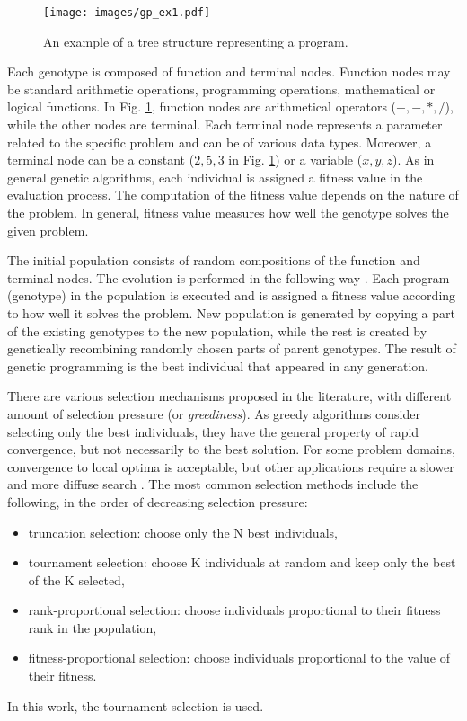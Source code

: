 \begin{figure}[H]
    \centering
    \texttt{[image: images/gp\_ex1.pdf]}
    \caption{An example of a tree structure representing a program.}
    \label{genprog:ex1}
\end{figure}

Each genotype is composed of function and terminal nodes.
Function nodes may be standard arithmetic operations, programming operations, mathematical or logical functions.
In Fig. \ref{genprog:ex1}, function nodes are arithmetical operators ($+, -, *, /$), while the other nodes are terminal.
Each terminal node represents a parameter related to the specific problem and can be of various data types.
Moreover, a terminal node can be a constant ($2, 5, 3$ in Fig. \ref{genprog:ex1}) or a variable ($x, y, z$).
As in general genetic algorithms, each individual is assigned a fitness value in the evaluation process.
The computation of the fitness value depends on the nature of the problem.
In general, fitness value measures how well the genotype solves the given problem.

The initial population consists of random compositions of the function and terminal nodes.
The evolution is performed in the following way \cite{koza1992genetic}.
Each program (genotype) in the population is executed and is assigned a fitness value according to how well it solves the problem.
New population is generated by copying a part of the existing genotypes to the new population, while the rest is created by genetically recombining randomly chosen parts of parent genotypes.
The result of genetic programming is the best individual that appeared in any generation.

There are various selection mechanisms proposed in the literature, with different amount of selection pressure (or \textit{greediness}).
As greedy algorithms consider selecting only the best individuals, they have the general property of rapid convergence, but not necessarily to the best solution.
For some problem domains, convergence to local optima is acceptable, but other applications require a slower and more diffuse search \cite{rozenberg2012handbook}.
The most common selection methods include the following, in the order of decreasing selection pressure:
\begin{itemize}
	\item truncation selection: choose only the N best individuals,
	\item tournament selection: choose K individuals at random and keep only the best of the K selected,
	\item rank-proportional selection: choose individuals proportional to their fitness rank in the population,
	\item fitness-proportional selection: choose individuals proportional to the value of their fitness.
\end{itemize}
In this work, the tournament selection is used.

